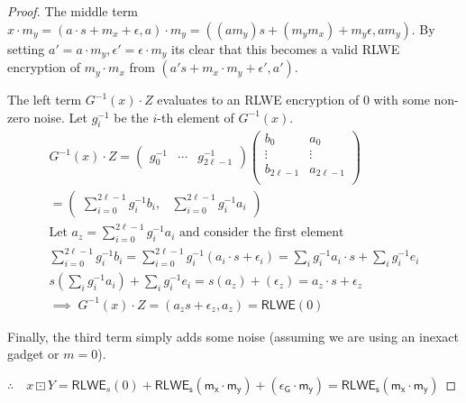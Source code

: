 \begin{theorem}
\begin{proof}
        The middle term $x\cdot m_y = (a\cdot s + m_x + \epsilon, a)\cdot m_y = ((am_y)s + (m_ym_x) + m_y\epsilon, am_y)$. By setting $a' = a\cdot m_y, \epsilon' = \epsilon \cdot m_y$ its clear that this becomes a valid RLWE encryption of $m_y\cdot m_x$ from $(a's + m_x\cdot m_y + \epsilon', a')$.

        The left term $G^{-1}(x)\cdot Z$ evaluates to an RLWE encryption of 0 with some non-zero noise. Let $g^{-1}_i$ be the $i$-th element of $G^{-1}(x)$.
        \begin{gather*}
            G^{-1}(x)\cdot Z = 
            \begin{pmatrix}
                g^{-1}_0 & \cdots &
                g^{-1}_{2\ell - 1}
            \end{pmatrix}
            \begin{pmatrix}
                b_0 & a_0 \\
                \vdots & \vdots \\
                b_{2\ell - 1} & a_{2\ell - 1} \\
            \end{pmatrix} \\
            =
            \left(
            \begin{array}{cc}
                \sum_{i=0}^{2\ell - 1}g^{-1}_ib_i, & \sum_{i=0}^{2\ell - 1}g^{-1}_ia_i 
            \end{array}
            \right) \\
            \text{Let }a_z = \sum_{i=0}^{2\ell - 1}g^{-1}_ia_i \text{ and consider the first element} \\
            \sum_{i=0}^{2\ell - 1}g^{-1}_ib_i = \sum_{i=0}^{2\ell - 1}g^{-1}_i(a_i\cdot s + \epsilon_i) = \sum_i g^{-1}_i a_i\cdot s + \sum_i g^{-1}_i e_i \\
            s\left(\sum_i g^{-1}_i a_i\right) + \sum_i g^{-1}_i e_i = s(a_z) + (\epsilon_z) = a_z\cdot s + \epsilon_z \\
            \implies\; G^{-1}(x)\cdot Z = (a_zs + \epsilon_z, a_z) = \mathsf{RLWE}(0)
        \end{gather*}      

        Finally, the third term simply adds some noise (assuming we are using an inexact gadget or $m = 0$).

        $\therefore \quad x\boxdot Y = \mathsf{RLWE}_s(0) + \mathsf{RLWE_s(m_x\cdot m_y) + (\epsilon_{G}\cdot m_y) = \mathsf{RLWE}_s(m_x\cdot m_y)}$
    \end{proof}
\end{theorem}

